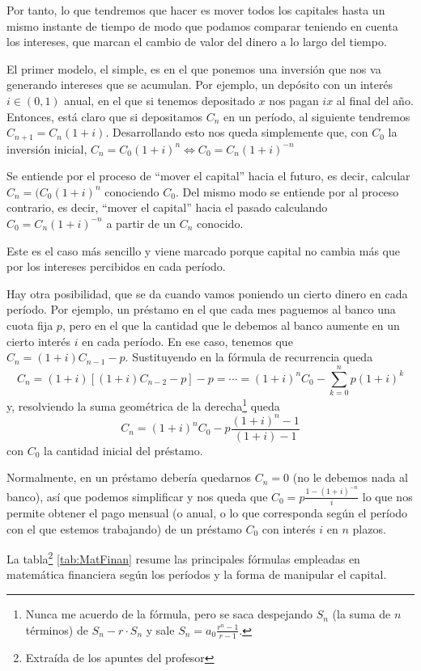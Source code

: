 \documentclass[nochap,palatino,shortheader]{apuntes}
\begin{document}
Por tanto, lo que tendremos que hacer es mover todos los capitales hasta un mismo instante de tiempo de modo que podamos comparar teniendo en cuenta los intereses, que marcan el cambio de valor del dinero a lo largo del tiempo.

El primer modelo, el simple, es en el que ponemos una inversión que nos va generando intereses que se acumulan. Por ejemplo, un depósito con un interés $i ∈ (0,1)$ anual, en el que si tenemos depositado $x$ nos pagan $ix$ al final del año. Entonces, está claro que si depositamos $C_n$ en un período, al siguiente tendremos $C_{n+1} = C_n(1+i)$. Desarrollando esto nos queda simplemente que, con $C_0$ la inversión inicial, \( C_n = C_0 (1+i)^n \iff C_0 = C_n (1+i)^{-n} \label{eq:InteresCapFijo} \)

Se entiende por  el proceso de ``mover el capital'' hacia el futuro, es decir, calcular $C_n=(C_0(1+i)^n$ conociendo $C_0$. Del mismo modo se entiende por  al proceso contrario, es decir, ``mover el capital'' hacia el pasado calculando $C_0=C_n(1+i)^{-n}$ a partir de un $C_n$ conocido.

Este es el caso más sencillo y viene marcado porque capital no cambia más que por los intereses percibidos en cada período.

Hay otra posibilidad, que se da cuando vamos poniendo un cierto dinero en cada período. Por ejemplo, un préstamo en el que cada mes paguemos al banco una cuota fija $p$, pero en el que la cantidad que le debemos al banco aumente en un cierto interés $i$ en cada período. En ese caso, tenemos que $C_n = (1 + i) C_{n-1} - p$. Sustituyendo en la fórmula de recurrencia queda \[ C_n = (1 + i) \left[ (1+i) C_{n-2} - p\right] - p = \dotsb = (1+i)^nC_0 - \sum_{k = 0}^{n} p (1 + i)^k \] y, resolviendo la suma geométrica de la derecha\footnote{Nunca me acuerdo de la fórmula, pero se saca despejando $S_n$ (la suma de $n$ términos) de $S_n - r·S_n$ y sale $S_n = a_0 \frac{r^n - 1}{r-1}$.} queda \[ C_n = (1+i)^nC_0 - p\frac{(1+i)^{n} - 1}{(1+i) - 1}  \] con $C_0$ la cantidad inicial del préstamo.

Normalmente, en un préstamo debería quedarnos $C_n = 0$ (no le debemos nada al banco), así que podemos simplificar y nos queda que \( C_0 = p \frac{1 - (1 + i)^{-n}}{i} \label{eq:InteresCapVariable}\) lo que nos permite obtener el pago mensual (o anual, o lo que corresponda según el período con el que estemos trabajando) de un préstamo $C_0$ con interés $i$ en $n$ plazos.

La tabla\footnote{Extraída de los apuntes del profesor} \ref{tab:MatFinan} resume las principales fórmulas empleadas en matemática financiera según los períodos y la forma de manipular el capital.
\end{document}

